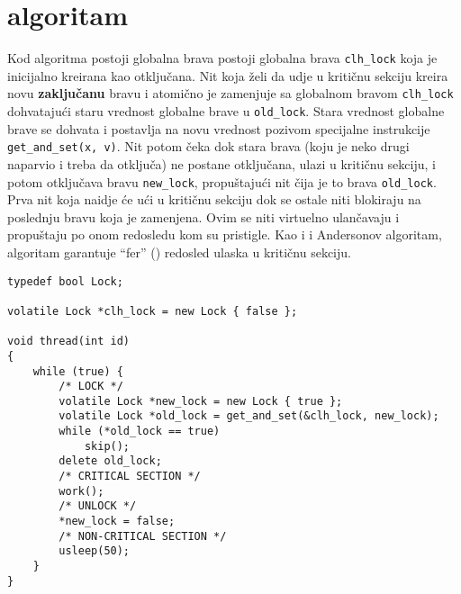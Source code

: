 \clearpage
\section{ algoritam}
Kod \textbf{} algoritma postoji globalna brava postoji globalna brava \texttt{clh\_lock} koja je inicijalno kreirana kao otklju\v{c}ana. Nit koja \v{z}eli da udje u kriti\v{c}nu sekciju kreira novu \textbf{zaklju\v{c}anu} bravu i atomi\v{c}no je zamenjuje sa globalnom bravom \texttt{clh\_lock} dohvataju\'{c}i staru vrednost globalne brave u \texttt{old\_lock}. Stara vrednost globalne brave se dohvata i postavlja na novu vrednost pozivom specijalne instrukcije \texttt{get\_and\_set(x, v)}. Nit potom \v{c}eka dok stara brava (koju je neko drugi naparvio i treba da otklju\v{c}a) ne postane otklju\v{c}ana, ulazi u kriti\v{c}nu sekciju, i potom otklju\v{c}ava bravu \texttt{new\_lock}, propu\v{s}taju\'{c}i nit \v{c}ija je to brava \texttt{old\_lock}. Prva nit koja naidje \'{c}e u\'{c}i u kriti\v{c}nu sekciju dok se ostale niti blokiraju na poslednju bravu koja je zamenjena. Ovim se niti virtuelno ulan\v{c}avaju i propu\v{s}taju po onom redosledu kom su pristigle. Kao i  i Andersonov algoritam,  algoritam garantuje ``fer'' () redosled ulaska u kriti\v{c}nu sekciju.

\begin{lstlisting}
typedef bool Lock;

volatile Lock *clh_lock = new Lock { false };

void thread(int id)
{
    while (true) {
        /* LOCK */
        volatile Lock *new_lock = new Lock { true };
        volatile Lock *old_lock = get_and_set(&clh_lock, new_lock);
        while (*old_lock == true)
            skip();
        delete old_lock;
        /* CRITICAL SECTION */
        work();
        /* UNLOCK */
        *new_lock = false;
        /* NON-CRITICAL SECTION */
        usleep(50);
    }
}
\end{lstlisting}
